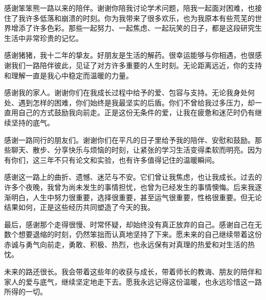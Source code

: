 感谢笨笨熊一路以来的陪伴。谢谢你陪我讨论学术问题，陪我一起面对困难，也接住了我许多低落和崩溃的时刻。你为我带来了很多欢乐，也为我原本有些荒芜的世界增添了许多色彩。那些一起努力、一起焦虑、一起玩笑的日子，都是这段研究生生活中非常珍贵的记忆。

感谢猪猪，我十二年的挚友。好朋友是生活的解药。很幸运能够与你相遇，也很感谢我们一路陪伴彼此，见证了对方许多重要的人生时刻。无论距离远近，你的支持和理解一直是我心中稳定而温暖的力量。

感谢我的家人。谢谢你们在我成长过程中给予的爱、包容与支持。无论我身处何处、遇到怎样的困难，你们始终是我最坚实的后盾。你们不曾给我过多压力，却一直用自己的方式鼓励我向前走。正是这份无条件的爱，让我在疲惫和迷茫时仍有继续坚持的底气。

感谢一路同行的朋友们。谢谢你们在平凡的日子里给予我的陪伴、安慰和鼓励。那些聊天、散步、分享快乐与烦恼的时刻，让紧张的学习生活变得柔软而明亮。因为有你们，这三年不只有论文和实验，也有许多值得记住的温暖瞬间。

感谢这一路上的曲折、遗憾、迷茫与不安。它们曾让我焦虑，也让我成长。过去的许多个夜晚，我曾为尚未发生的事情担忧，也曾为已经发生的事情懊悔。后来我逐渐明白，人生中努力很重要，选择很重要，甚至运气很重要，性格很重要。但无论结果如何，正是这些经历共同塑造了今天的我。

最后，感谢那个走得很慢、时常怀疑，却始终没有真正放弃的自己。感谢自己在无数个想要退缩的时刻，仍然笨拙而认真地坚持了下来。愿未来的自己继续带着这份赤诚与勇气向前走，勇敢、积极、热烈，也永远保有对真理的热爱和对生活的热忱。

未来的路还很长。我会带着这些年的收获与成长，带着师长的教诲、朋友的陪伴和家人的爱与底气，继续坚定地走下去。愿我永远记得这份温暖，也永远珍惜这一路所得的一切。